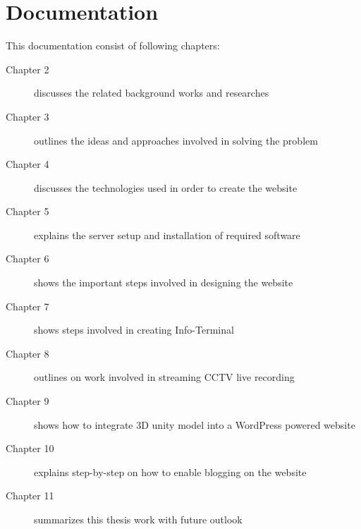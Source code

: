 \section{Documentation}
This documentation consist of following chapters:
\begin{description}
\item[Chapter 2] discusses the related background works and researches
\item[Chapter 3] outlines the ideas and approaches involved in solving the problem
\item[Chapter 4] discusses the technologies used in order to create the website
\item[Chapter 5] explains the server setup and installation of required software
\item[Chapter 6] shows the important steps involved in designing the website
\item[Chapter 7] shows steps involved in creating Info-Terminal
\item[Chapter 8] outlines on work involved in streaming CCTV live recording
\item[Chapter 9] shows how to integrate 3D unity model into a WordPress powered website
\item[Chapter 10] explains step-by-step on how to enable blogging on the website
\item[Chapter 11] summarizes this thesis work with future outlook
\end{description}